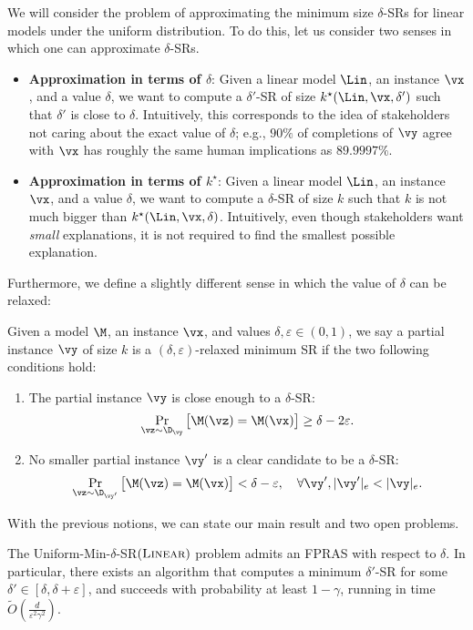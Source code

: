 We will consider the problem of approximating the minimum size $\delta$-SRs for linear models under the uniform distribution. To do this, let us consider two senses in which one can approximate $\delta$-SRs.
\begin{itemize}
    \item \textbf{Approximation in terms of $\delta$}: Given a linear model $\Lin$, an instance $\vx$, and a value $\delta$, we want to compute a $\delta'$-SR of size $k^\star(\Lin, \vx, \delta')$ such that $\delta'$ is close to $\delta$. Intuitively, this corresponds to the idea of stakeholders not caring about the exact value of $\delta$; e.g., $90\%$ of completions of $\vy$ agree with $\vx$ has roughly the same human implications as $89.9997\%$.
    \item \textbf{Approximation in terms of $k^\star$}: Given a linear model $\Lin$, an instance $\vx$, and a value $\delta$, we want to compute a $\delta$-SR of size $k$ such that $k$ is not much bigger than $k^\star(\Lin, \vx, \delta)$. Intuitively, even though stakeholders want \emph{small} explanations, it is not required to find the smallest possible explanation.
\end{itemize}

Furthermore, we define a slightly different sense in which the value of $\delta$ can be relaxed:

\begin{definition}
    Given a model $\M$, an instance $\vx$, and values $\delta, \varepsilon \in (0, 1)$, we say a partial instance $\vy$ of size $k$ is a $(\delta, \varepsilon)$-relaxed minimum SR if the two following conditions hold:
    \begin{enumerate}
        \item The partial instance $\vy$ is close enough to a $\delta$-SR:
        \[
            \Pr_{\vz \sim \D_{\vy}}\big[\M(\vz) = \M(\vx)\big] \geq \delta - 2\varepsilon.
        \]
        \item No smaller partial instance $\vy'$ is a clear candidate to be a $\delta$-SR:
        \[
            \Pr_{\vz \sim \D_{\vy'}}\big[\M(\vz) = \M(\vx)\big] < \delta - \varepsilon, \quad \forall \vy', |\vy'|_e < |\vy|_e.
        \]
    \end{enumerate}
\end{definition}


With the previous notions, we can state our main result and two open problems.
\begin{theorem}\label{thm:delta-approximation}
    The Uniform-Min-$\delta$-SR$(\textsc{Linear})$ problem admits an FPRAS with respect to $\delta$. In particular, there exists an algorithm that computes a minimum $\delta'$-SR for some $\delta' \in [\delta, \delta + \varepsilon]$, and succeeds with probability at least $1-\gamma$, running in time $\tilde{O}\left(\frac{d}{\varepsilon^2\gamma^2}\right)$.
\end{theorem}

